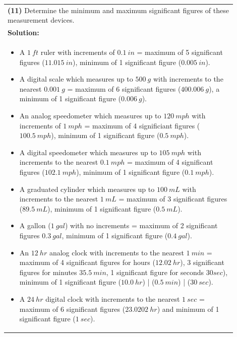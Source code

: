 \documentclass{article}
\begin{document}
\begin{tabular}{|p{0.9\linewidth}|}
\hline
\textbf{(11)} Determine the minimum and maximum significant figures of these measurement devices. \\
\textbf{Solution:} \\
\begin{itemize}
    \item A $1~ft$ ruler with increments of $0.1~in$ = maximum of 5 significant figures ($11.015~in$), minimum of 1 significant figure ($0.005~in$).
    \item A digital scale which measures up to $500~g$ with increments to the nearest $0.001~g$ = maximum of 6 significant figures ($400.006~g$), a minimum of 1 significant figure ($0.006~g$).
    \item An analog speedometer which measures up to $120~mph$ with increments of $1~mph$ = maximum of 4 significiant figures ($100.5~mph$), minimum of 1 significant figure ($0.5~mph$).
    \item A digital speedometer which measures up to $105~mph$ with increments to the nearest $0.1~mph$ = maximum of 4 significant figures ($102.1~mph$), minimum of 1 significant figure ($0.1~mph$).
    \item A graduated cylinder which measures up to $100~mL$ with increments to the nearest $1~mL$ = maximum of 3 significant figures ($89.5~mL$), minimum of 1 significant figure ($0.5~mL$).
    \item A gallon ($1~gal$) with no increments = maximum of 2 significant figures $0.3~gal$, minimum of 1 significant figure ($0.4~gal$).
    \item An $12~hr$ analog clock with increments to the nearest $1~min$ = maximum of 4 significant figures for hours ($12.02~hr$), 3 significant figures for minutes $35.5~min$, 1 significant figure for seconds $30 sec$), minimum of 1 significant figure ($10.0~hr$) | ($0.5~min$) | ($30~sec$).
    \item A $24~hr$ digital clock with increments to the nearest $1~sec$ = maximum of 6 significant figures ($23.0202~hr$) and minimum of 1 significant figure ($1~sec$).
\end{itemize} \\
\hline
\end{tabular}
\end{document}
